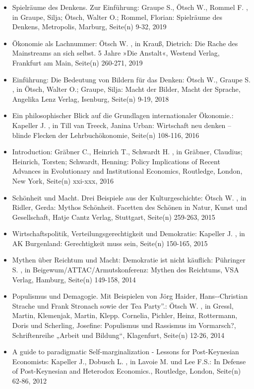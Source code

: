 \begin{itemize}
\item Spielräume des Denkens. Zur Einführung: Graupe S., Ötsch W., Rommel F. , in Graupe, Silja; Ötsch, Walter O.; Rommel, Florian: Spielräume des Denkens, Metropolis, Marburg, Seite(n) 9-32, 2019
\item Ökonomie als Lachnummer: Ötsch W. , in Krauß, Dietrich: Die Rache des Mainstreams an sich selbst. 5 Jahre »Die Anstalt«, Westend Verlag, Frankfurt am Main, Seite(n) 260-271, 2019
\item Einführung: Die Bedeutung von Bildern für das Denken: Ötsch W., Graupe S. , in Ötsch, Walter O.; Graupe, Silja: Macht der Bilder, Macht der Sprache, Angelika Lenz Verlag, Isenburg, Seite(n) 9-19, 2018
\item Ein philosophischer Blick auf die Grundlagen internationaler Ökonomie.: Kapeller J. , in Till van Treeck, Janina Urban: Wirtschaft neu denken – blinde Flecken der Lehrbuchökonomie, Seite(n) 108-116, 2016
\item Introduction: Gräbner C., Heinrich T., Schwardt H. , in Gräbner, Claudius; Heinrich, Torsten; Schwardt, Henning: Policy Implications of Recent Advances in Evolutionary and Institutional Economics, Routledge, London, New York, Seite(n) xxi-xxx, 2016
\item Schönheit und Macht. Drei Beispiele aus der Kulturgeschichte: Ötsch W. , in Ridler, Gerda: Mythos Schönheit. Facetten des Schönen in Natur, Kunst und Gesellschaft, Hatje Cantz Verlag, Stuttgart, Seite(n) 259-263, 2015
\item Wirtschaftspolitik, Verteilungsgerechtigkeit und Demokratie: Kapeller J. , in AK Burgenland: Gerechtigkeit muss sein, Seite(n) 150-165, 2015
\item Mythen über Reichtum und Macht: Demokratie ist nicht käuflich: Pühringer S. , in Beigewum/ATTAC/Armutskonferenz: Mythen des Reichtums, VSA Verlag, Hamburg, Seite(n) 149-158, 2014
\item Populismus und Demagogie. Mit Beispielen von Jörg Haider, Hans-­‐Christian Strache und Frank Stronach sowie der Tea Party”.: Ötsch W. , in Gressl, Martin, Klemenjak, Martin, Klepp. Cornelia, Pichler, Heinz, Rottermann, Doris und Scherling, Josefine: Populismus und Rassismus im Vormarsch?, Schriftenreihe „Arbeit und Bildung“, Klagenfurt, Seite(n) 12-26, 2014
\item A guide to paradigmatic Self-marginalization - Lessons for Post-Keynesian Economists: Kapeller J., Dobusch L. , in Lavoie M. und Lee F.S.: In Defense of Post-Keynesian and Heterodox Economics., Routledge, London, Seite(n) 62-86, 2012

\end{itemize}
